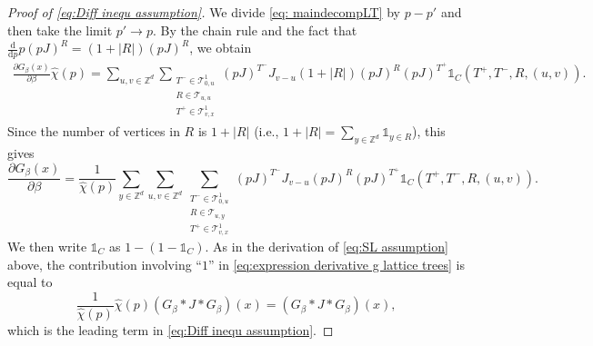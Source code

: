 \documentclass[11pt,a4paper]{article}
\numberwithin{equation}{section}
\theoremstyle{plain}
\theoremstyle{definition}
\newcommand\1{\mathds{1}}
\begin{document}
\begin{proof}[Proof of \eqref{eq:Diff inequ assumption}]
We divide \eqref{eq: maindecompLT} by $p-p'$ and then take the limit $p' \rightarrow p$.
By the chain rule and the fact that $\tfrac{\mathrm{d}}{\mathrm{d}p}p(pJ)^R=(1+|R|)(pJ)^R$, we obtain
\begin{align}
     \frac{\partial G_\beta(x)}{\partial \beta}
     \hat{\chi}(p)
     = \sum_{u,v \in \mathbb{Z}^d}
     \sum_{\substack{T^- \in \mathcal{T}^1_{0,u} \\ R \in \mathcal{T}_{u,u}\\ T^+ \in \mathcal{T}^1_{v,x}} }
     (pJ)^{T^{-}} J_{v-u} (1+|R|) (pJ)^{R}(pJ)^{T^{+}} \1_{C}(T^+,T^-,R,(u,v)).
\end{align}
Since the number of vertices in $R$ is $1+|R|$ (i.e., $1+|R|=\sum_{y\in \mathbb Z^d}\mathds{1}_{y\in R}$), this gives
\begin{equation}\label{eq:expression derivative g lattice trees}
    \frac{\partial G_\beta(x)}{\partial \beta}
    =
    \frac{1}{\hat{\chi}(p)}
    \sum_{y \in \mathbb{Z}^d}
    \sum_{u,v \in \mathbb{Z}^d}
    \sum_{\substack{T^- \in \mathcal{T}^1_{0,u} \\ R \in \mathcal{T}_{u,y}
    \\ T^+ \in \mathcal{T}^1_{v,x}}}
    (pJ)^{T^{-}} J_{v-u} (pJ)^{R}(pJ)^{T^{+}} \1_{C}(T^+,T^-,R,(u,v)).
\end{equation}
We then write $\1_C$ as $1-(1-\1_C)$. As in the derivation of \eqref{eq:SL assumption} above, the contribution involving ``$1$'' in \eqref{eq:expression derivative g lattice trees} is equal to
\begin{equation}
    \frac{1}{\hat\chi(p)} \hat\chi(p) (G_{\beta}*J*G_\beta)(x)
    =
    (G_{\beta}*J*G_\beta)(x),
\end{equation}
which is the leading term in \eqref{eq:Diff inequ assumption}.


\end{proof}
\end{document}
